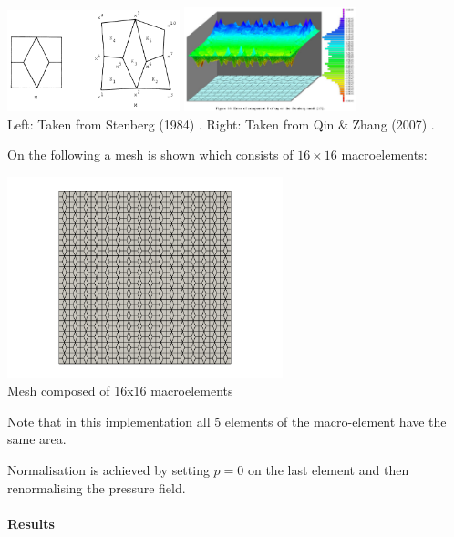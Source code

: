 \begin{center}
\includegraphics[width=5cm]{python_codes/fieldstone_78/images/sten84}
\includegraphics[width=5cm]{python_codes/fieldstone_78/images/qizh07}\\
{\captionfont Left: Taken from Stenberg (1984) \cite{sten84}. 
Right: Taken from Qin \& Zhang (2007) \cite{qizh07}.}
\end{center}

On the following a mesh is shown which consists of $16\times 16$ macroelements:

\begin{center}
\includegraphics[width=8cm]{python_codes/fieldstone_78/images/mesh}\\
{\captionfont Mesh composed of 16x16 macroelements}
\end{center}
Note that in this implementation all 5 elements of the macro-element have the 
same area. 

Normalisation is achieved by setting $p=0$ on the last element and then 
renormalising the pressure field.

\paragraph{Results}

